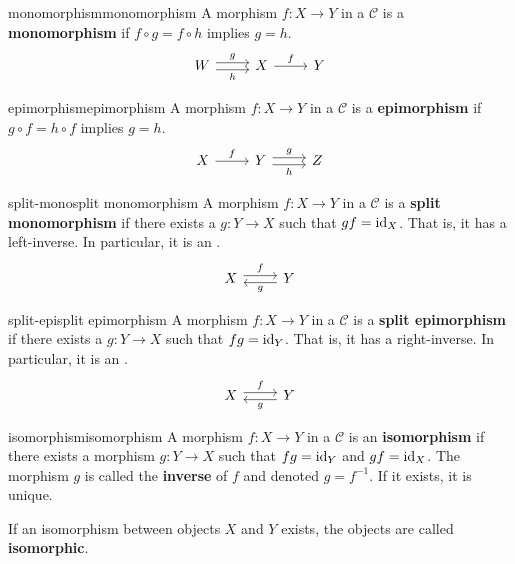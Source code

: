 \begin{topic}{monomorphism}{monomorphism}
    A morphism $f : X \to Y$ in a  $\mathcal{C}$ is a \textbf{monomorphism} if $f \circ g = f \circ h$ implies $g = h$.
    \[ \begin{tikzcd} W \arrow[shift left=0.25em]{r}{g} \arrow[shift right=0.25em, swap]{r}{h} & X \arrow{r}{f} & Y \end{tikzcd} \]
\end{topic}

\begin{topic}{epimorphism}{epimorphism}
    A morphism $f : X \to Y$ in a  $\mathcal{C}$ is a \textbf{epimorphism} if $g \circ f = h \circ f$ implies $g = h$.
    \[ \begin{tikzcd} X \arrow{r}{f} & Y \arrow[shift left=0.25em]{r}{g} \arrow[shift right=0.25em, swap]{r}{h} & Z \end{tikzcd} \]
\end{topic}

\begin{topic}{split-mono}{split monomorphism}
    A morphism $f : X \to Y$ in a  $\mathcal{C}$ is a \textbf{split monomorphism} if there exists a $g : Y \to X$ such that $gf = \textup{id}_X$. That is, it has a left-inverse. In particular, it is an .
    \[ \begin{tikzcd} X \arrow[shift left=0.25em]{r}{f} & Y \arrow[shift left=0.25em]{l}{g} \end{tikzcd} \]
\end{topic}

\begin{topic}{split-epi}{split epimorphism}
    A morphism $f : X \to Y$ in a  $\mathcal{C}$ is a \textbf{split epimorphism} if there exists a $g : Y \to X$ such that $fg = \textup{id}_Y$. That is, it has a right-inverse. In particular, it is an .
    \[ \begin{tikzcd} X \arrow[shift left=0.25em]{r}{f} & Y \arrow[shift left=0.25em]{l}{g} \end{tikzcd} \]
\end{topic}

\begin{topic}{isomorphism}{isomorphism}
    A morphism $f : X \to Y$ in a  $\mathcal{C}$ is an \textbf{isomorphism} if there exists a morphism $g : Y \to X$ such that $fg = \textup{id}_Y$ and $gf = \textup{id}_X$. The morphism $g$ is called the \textbf{inverse} of $f$ and denoted $g = f^{-1}$. If it exists, it is unique.
    
    If an isomorphism between objects $X$ and $Y$ exists, the objects are called \textbf{isomorphic}.
\end{topic}

